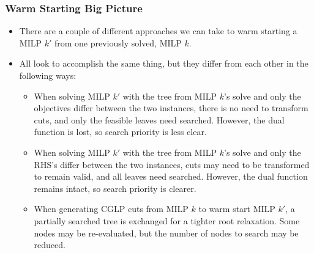 \documentclass{beamer}
\begin{document}
	\begin{frame}[t]
		\frametitle{Warm Starting Big Picture}
		\small
		\vspace{-.5cm}
		\begin{itemize}
			\item There are a couple of different approaches we can take to warm starting a MILP $ k' $ from one previously solved, MILP $ k $.
			\item All look to accomplish the same thing, but they differ from each other in the following ways:
			\begin{itemize}
				\item When solving MILP $ k' $ with the tree from MILP $ k $'s solve and only the objectives differ between the two instances, there is no need to transform cuts, and only the feasible leaves need searched. However, the dual function is lost, so search priority is less clear.
				\item When solving MILP $ k' $ with the tree from MILP $ k $'s solve and only the RHS's differ between the two instances, cuts may need to be transformed to remain valid, and all leaves need searched. However, the dual function remains intact, so search priority is clearer.
				\item When generating CGLP cuts from MILP $ k $ to warm start MILP $ k' $, a partially searched tree is exchanged for a tighter root relaxation. Some nodes may be re-evaluated, but the number of nodes to search may be reduced.
			\end{itemize}
		\end{itemize}
		\normalsize
	\end{frame}
	
\end{document}
